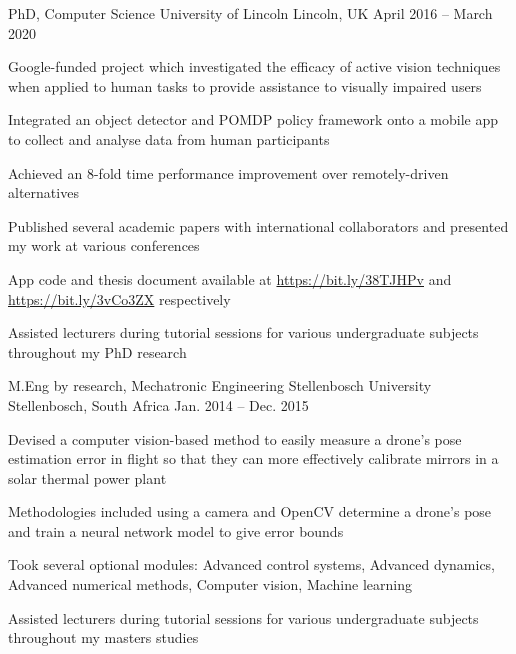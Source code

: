 \documentclass[11pt,a4paper]{awesome-cv}        %
\begin{document}
\makecvheader



\begin{cventries}
  \cventry
  {PhD, Computer Science}
  {University of Lincoln}
  {Lincoln, UK}
  {April 2016 -- March 2020}
  {
    \begin{cvitems}
      \item Google-funded project which investigated the efficacy of active vision techniques when applied to human tasks to provide assistance to visually impaired users
      \item Integrated an object detector and POMDP policy framework onto a mobile app to collect and analyse data from human participants
      \item Achieved an 8-fold time performance improvement over remotely-driven alternatives
      \item Published several academic papers with international collaborators and presented my work at various conferences
      \item App code and thesis document available at \url{https://bit.ly/38TJHPv} and \url{https://bit.ly/3vCo3ZX} respectively
      \item Assisted lecturers during tutorial sessions for various undergraduate subjects throughout my PhD research
    \end{cvitems}
  }
  \cventry
  {M.Eng by research, Mechatronic Engineering}
  {Stellenbosch University}
  {Stellenbosch, South Africa}
  {Jan. 2014 -- Dec. 2015}
  {
    \begin{cvitems}
      \item Devised a computer vision-based method to easily measure a drone's pose estimation error in flight so that they can more effectively calibrate mirrors in a solar thermal power plant
      \item Methodologies included using a camera and OpenCV determine a drone's pose and train a neural network model to give error bounds
      \item Took several optional modules: Advanced control systems, Advanced dynamics, Advanced numerical methods, Computer vision, Machine learning
      \item Assisted lecturers during tutorial sessions for various undergraduate subjects throughout my masters studies

\end{cvitems}}
\end{cventries}
\end{document}
